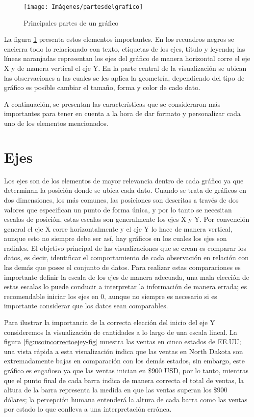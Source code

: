 \documentclass[
]{book}
\begin{document}
\begin{figure}

{\centering \texttt{[image: Imágenes/partesdelgrafico]} 

}

\caption{Principales partes de un gráfico}\label{fig:partesgrafico-fig}
\end{figure}

La figura \ref{fig:partesgrafico-fig} presenta estos elementos importantes. En los recuadros negros se encierra todo lo relacionado con texto, etiquetas de los ejes, título y leyenda; las líneas naranjadas representan los ejes del gráfico de manera horizontal corre el eje X y de manera vertical el eje Y. En la parte central de la visualización se ubican las observaciones a las cuales se les aplica la geometría, dependiendo del tipo de gráfico es posible cambiar el tamaño, forma y color de cado dato.

A continuación, se presentan las características que se consideraron más importantes para tener en cuenta a la hora de dar formato y personalizar cada uno de los elementos mencionados.

\hypertarget{ejes}{%
\section{Ejes}\label{ejes}}

Los ejes son de los elementos de mayor relevancia dentro de cada gráfico ya que determinan la posición donde se ubica cada dato. Cuando se trata de gráficos en dos dimensiones, los más comunes, las posiciones son descritas a través de dos valores que especifican un punto de forma única, y por lo tanto se necesitan escalas de posición, estas escalas son generalmente los ejes X y Y. Por convención general el eje X corre horizontalmente y el eje Y lo hace de manera vertical, aunque esto no siempre debe ser así, hay gráficos en los cuales los ejes son radiales.
El objetivo principal de las visualizaciones que se crean es comparar los datos, es decir, identificar el comportamiento de cada observación en relación con las demás que posee el conjunto de datos. Para realizar estas comparaciones es importante definir la escala de los ejes de manera adecuada, una mala elección de estas escalas lo puede conducir a interpretar la información de manera errada; es recomendable iniciar los ejes en 0, aunque no siempre es necesario si es importante considerar que los datos sean comparables.

Para ilustrar la importancia de la correcta elección del inicio del eje Y consideremos la visualización de cantidades a lo largo de una escala lineal. La figura \ref{fig:usoincorrectoejey-fig} muestra las ventas en cinco estados de EE.UU; una vista rápida a esta visualización indica que las ventas en North Dakota son extremadamente bajas en comparación con los demás estados, sin embargo, este gráfico es engañoso ya que las ventas inician en \(\$900\) USD, por lo tanto, mientras que el punto final de cada barra indica de manera correcta el total de ventas, la altura de la barra representa la medida en que las ventas superan los \(\$900\) dólares; la percepción humana entenderá la altura de cada barra como las ventas por estado lo que conlleva a una interpretación errónea.
\end{document}
